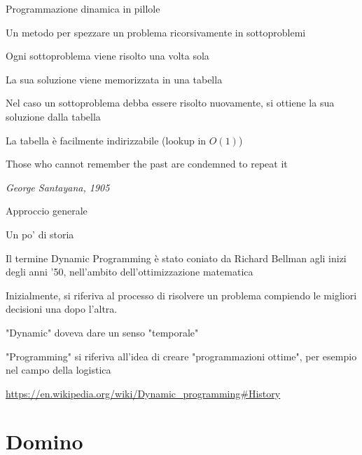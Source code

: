 \begin{frame}{Programmazione dinamica in pillole}

\BIL
\item Un metodo per spezzare un problema ricorsivamente in sottoproblemi
\item Ogni sottoproblema viene risolto una volta sola
\item La sua soluzione viene memorizzata in una tabella
\item Nel caso un sottoproblema debba essere risolto nuovamente, si ottiene la
  sua soluzione dalla tabella
\item La tabella è facilmente indirizzabile (lookup in $O(1)$)
\EIL
    
\epigraph{\alert{Those who cannot remember the past are condemned to repeat it}
}{\textit{George Santayana, 1905}}

\end{frame}




\begin{frame}{Approccio generale}

\vspace{-9pt}

\end{frame}

\begin{frame}{Un po' di storia}

\BIL
\item Il termine \alert{Dynamic Programming} è stato coniato da Richard Bellman 
agli inizi degli anni '50, nell'ambito dell'ottimizzazione matematica   
\item Inizialmente, si riferiva al processo di risolvere un problema compiendo
le migliori decisioni una dopo l'altra.
\item "Dynamic" doveva dare un senso "temporale"
\item "Programming" si riferiva all'idea di creare "programmazioni ottime",
per esempio nel campo della logistica
\EIL

\bigskip
\url{https://en.wikipedia.org/wiki/Dynamic_programming\#History}

\end{frame}



\section{Domino}

